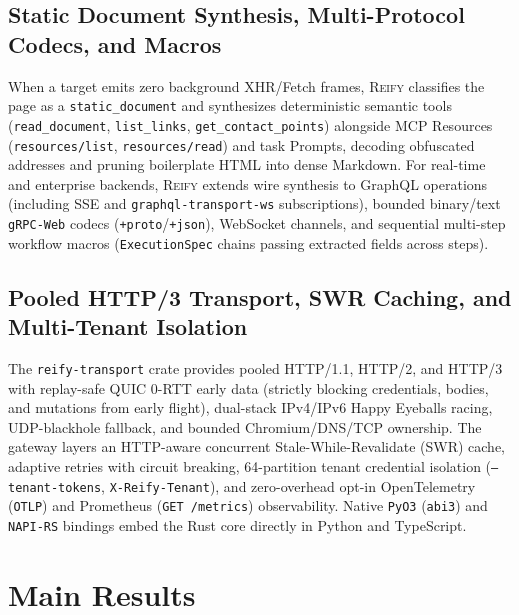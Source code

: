 \documentclass[10pt,twocolumn]{article}
\begin{document}
\subsection{Static Document Synthesis, Multi-Protocol Codecs, and Macros}
When a target emits zero background XHR/Fetch frames, \textsc{Reify} classifies the page as a \texttt{static\_document} and synthesizes deterministic semantic tools (\texttt{read\_document}, \texttt{list\_links}, \texttt{get\_contact\_points}) alongside MCP Resources (\texttt{resources/list}, \texttt{resources/read}) and task Prompts, decoding obfuscated addresses and pruning boilerplate HTML into dense Markdown. For real-time and enterprise backends, \textsc{Reify} extends wire synthesis to GraphQL operations (including SSE and \texttt{graphql-transport-ws} subscriptions), bounded binary/text \texttt{gRPC-Web} codecs (\texttt{+proto}/\texttt{+json}), WebSocket channels, and sequential multi-step workflow macros (\texttt{ExecutionSpec} chains passing extracted fields across steps).

\subsection{Pooled HTTP/3 Transport, SWR Caching, and Multi-Tenant Isolation}
The \texttt{reify-transport} crate provides pooled HTTP/1.1, HTTP/2, and HTTP/3 with replay-safe QUIC 0-RTT early data (strictly blocking credentials, bodies, and mutations from early flight), dual-stack IPv4/IPv6 Happy Eyeballs racing, UDP-blackhole fallback, and bounded Chromium/DNS/TCP ownership. The gateway layers an HTTP-aware concurrent Stale-While-Revalidate (SWR) cache, adaptive retries with circuit breaking, 64-partition tenant credential isolation (\texttt{--tenant-tokens}, \texttt{X-Reify-Tenant}), and zero-overhead opt-in OpenTelemetry (\texttt{OTLP}) and Prometheus (\texttt{GET /metrics}) observability. Native \texttt{PyO3} (\texttt{abi3}) and \texttt{NAPI-RS} bindings embed the Rust core directly in Python and TypeScript.

\section{Main Results}
\end{document}
